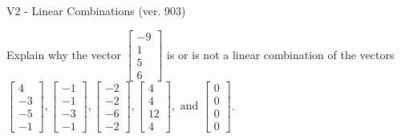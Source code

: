 \begin{exercise}
  \begin{exerciseTitle}V2 - Linear Combinations (ver. 903)\end{exerciseTitle}
  \begin{exerciseStatement}
    Explain why the vector \(\left[\begin{array}{c}
-9 \\
1 \\
5 \\
6
\end{array}\right]\)  is or is not a linear 
	combination of the vectors \(\left[\begin{array}{c}
4 \\
-3 \\
-5 \\
-1
\end{array}\right] , \left[\begin{array}{c}
-1 \\
-1 \\
-3 \\
-1
\end{array}\right] , \left[\begin{array}{c}
-2 \\
-2 \\
-6 \\
-2
\end{array}\right] , \left[\begin{array}{c}
4 \\
4 \\
12 \\
4
\end{array}\right] , \text{ and } \left[\begin{array}{c}
0 \\
0 \\
0 \\
0
\end{array}\right]\).
	



\end{exerciseStatement}
\end{exercise}
